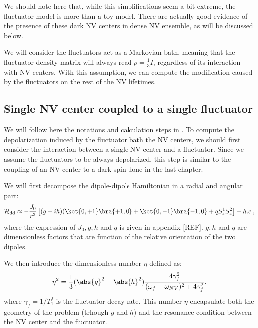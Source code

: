 \documentclass[a4paper,11pt]{report}
\begin{document}
We should note here that, while this simplifications seem a bit extreme, the fluctuator model is more than a toy model. There are actually good evidence of the presence of these dark NV centers in dense NV ensemble, as will be discussed below.

We will consider the fluctuators act as a Markovian bath, meaning that the fluctuator density matrix will always read $\rho = \frac{1}{3} I$, regardless of its interaction with NV centers. With this assumption, we can compute the modification caused by the fluctuators on the rest of the NV lifetimes.


\subsection{Single NV center coupled to a single fluctuator}
We will follow here the notations and calculation steps in \citep{choi2017depolarization}. To compute the depolarization induced by the fluctuator bath the NV centers, we should first consider the interaction between a single NV center and a fluctuator. Since we assume the fluctuators to be always depolarized, this step is similar to the coupling of an NV center to a dark spin done in the last chapter.

We will first decompose the dipole-dipole Hamiltonian in a radial and angular part:
\begin{equation}
\mathcal{H}_{\rm dd} \approx - \frac{J_0}{r^3} \left[(g+ih)(\ket{0,+1}\bra{+1,0}+\ket{0,-1}\bra{-1,0}+qS_z^1 S_z^2 \right] + h.c. ,
\end{equation}
where the expression of $J_0, g, h$ and $q$ is given in appendix [REF]. $g, h$ and $q$ are dimensionless factors that are function of the relative orientation of the two dipoles.

We then introduce the dimensionless number $\eta$ defined as:
\begin{equation}
\eta^2=\frac{1}{3} (\abs{g}^2+\abs{h}^2)  \frac{4\gamma_f^2}{(\omega_f - \omega_{NV})^2+4\gamma_f^2},
\end{equation}
where $\gamma_f=1/T_1^f$ is the fluctuator decay rate. This number $\eta$ encapsulate both the geometry of the problem (trhough $g$ and $h$) and the resonance condition between the NV center and the fluctuator.
\end{document}
